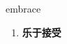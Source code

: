 
\begin{frame}
{\huge embrace}
\begin{center}
\begin{enumerate}\Large
  \item \textbf{乐于接受}
\end{enumerate}
\end{center}
\end{frame}
